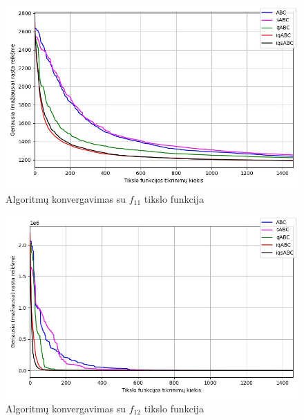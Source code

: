\documentclass{VUMIFPSmagistrinis}
\begin{document}
\begin{landscape}
\begin{multicols}{2}
\begin{figure}[H]
    \centering
    \includegraphics[scale=0.45]{img/2kv/all_f11.jpg}
    \caption{Algoritmų konvergavimas su $f_{11}$ tikslo funkcija}
    \label{img:konf11}
\end{figure}



\begin{figure}[H]
    \centering
    \includegraphics[scale=0.45]{img/2kv/all_f12.jpg}
    \caption{Algoritmų konvergavimas su $f_{12}$ tikslo funkcija}
    \label{img:konf12}
\end{figure}






\end{multicols}
\begin{multicols}{2}



\end{multicols}
\end{landscape}
\end{document}
